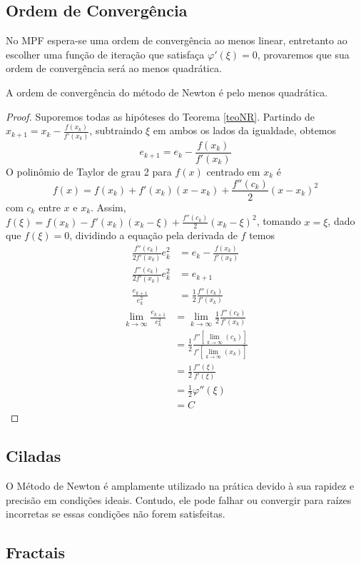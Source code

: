 \subsection{Ordem de Convergência}
No MPF espera-se uma ordem de convergência ao menos linear, entretanto ao escolher uma função de iteração que satisfaça $\varphi'(\xi) = 0$, provaremos que sua ordem de convergência será ao menos quadrática.
\begin{prop}
    A ordem de convergência do método de Newton é pelo menos quadrática.
\end{prop}
\begin{proof}
    Suporemos todas as hipóteses do Teorema \ref{teoNR}. %
    Partindo de $x_{k+1} = x_k - \frac{f(x_k)}{f'(x_k)}$, subtraindo $\xi$ em ambos os lados da igualdade, obtemos
\begin{equation} \label{eMNR}
    e_{k+1} = e_k - \frac{f(x_k)}{f'(x_k)} 
\end{equation}
O polinômio de Taylor de grau 2 para $f(x)$ centrado em $x_k$ é
\begin{equation*}
    f(x) = f(x_k) + f'(x_k)(x - x_k) + \frac{f''(c_k)}{2}(x-x_k)^2
\end{equation*}
com $c_k$ entre $x$ e $x_k$.
Assim, $f(\xi) = f(x_k) - f'(x_k)(x_k - \xi) + \frac{f''(c_k)}{2}(x_k-\xi)^2$,
tomando $x = \xi$, dado que $f(\xi) = 0$, dividindo a equação pela derivada de $f$ temos
\begin{align*}
    \frac{f''(c_k)}{2f'(x_k)}e_k^2 &= e_k - \frac{f(x_k)}{f'(x_k)} \\
    \frac{f''(c_k)}{2f'(x_k)}e_k^2 &= e_{k+1} \\
    \frac{e_{k+1}}{e_k^2} &= \frac{1}{2} \frac{f''(c_k)}{f'(x_k)}
\end{align*}
\begin{align*}
    \lim_{k \to \infty} \frac{e_{k+1}}{e_k^2} &= \lim_{k \to \infty} \frac{1}{2} \frac{f''(c_k)}{f'(x_k)} \\
     &= \frac{1}{2} \frac{f''[\lim_{k \to \infty} (c_k)]}{f'[\lim_{k \to \infty} (x_k)]} \\
     &= \frac{1}{2} \frac{f''(\xi)}{f'(\xi)} \\
     &= \frac{1}{2} \varphi''(\xi) \\ %
     &= C
\end{align*}
\end{proof}
\subsection{Ciladas}
O Método de Newton é amplamente utilizado na prática devido à sua rapidez e precisão em condições ideais. Contudo, ele pode falhar ou convergir para raízes incorretas se essas condições não forem satisfeitas. 
\subsection{Fractais}